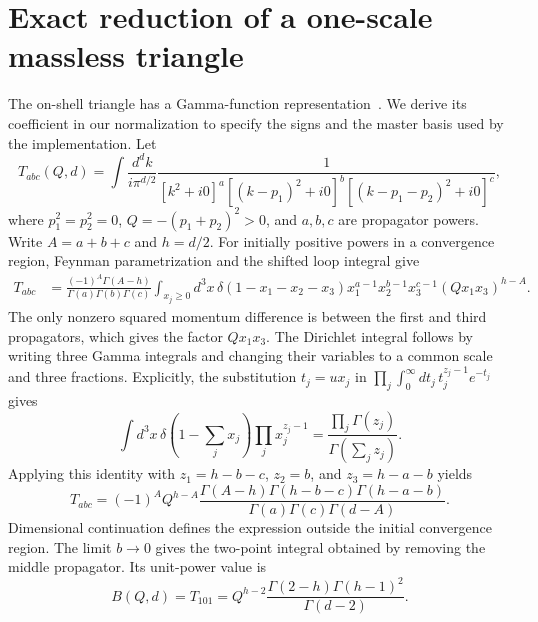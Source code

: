 \section{Exact reduction of a one-scale massless triangle}
\label{notes-triangle:app:triangle}
The on-shell triangle has a Gamma-function representation~\cite{DavydychevOsland1998}. We derive its coefficient in our normalization to specify the signs and the master basis used by the implementation. Let
\begin{equation}
 T_{abc}(Q,d)=\int\frac{d^d k}{i\pi^{d/2}}
 \frac{1}{[k^2+i0]^a[(k-p_1)^2+i0]^b[(k-p_1-p_2)^2+i0]^c},
 \label{notes-triangle:eq:triangle-definition}
\end{equation}
where $p_1^2=p_2^2=0$, $Q=-(p_1+p_2)^2>0$, and $a,b,c$ are propagator powers. Write $A=a+b+c$ and $h=d/2$. For initially positive powers in a convergence region, Feynman parametrization and the shifted loop integral give
\begin{align}
 T_{abc}&=\frac{(-1)^A\Gamma(A-h)}{\Gamma(a)\Gamma(b)\Gamma(c)}
 \int_{x_j\geq0} d^3x\,\delta(1-x_1-x_2-x_3)
 x_1^{a-1}x_2^{b-1}x_3^{c-1}(Qx_1x_3)^{h-A}.
 \label{notes-triangle:eq:triangle-parameters}
\end{align}
The only nonzero squared momentum difference is between the first and third propagators, which gives the factor $Qx_1x_3$. The Dirichlet integral follows by writing three Gamma integrals and changing their variables to a common scale and three fractions. Explicitly, the substitution $t_j=u x_j$ in $\prod_j\int_0^\infty dt_j\,t_j^{z_j-1}e^{-t_j}$ gives
\begin{equation}
 \int d^3x\,\delta(1-\textstyle\sum_j x_j)\prod_jx_j^{z_j-1}
 =\frac{\prod_j\Gamma(z_j)}{\Gamma(\sum_jz_j)}.
 \label{notes-triangle:eq:triangle-dirichlet}
\end{equation}
Applying this identity with $z_1=h-b-c$, $z_2=b$, and $z_3=h-a-b$ yields
\begin{equation}
 T_{abc}=(-1)^A Q^{h-A}
 \frac{\Gamma(A-h)\Gamma(h-b-c)\Gamma(h-a-b)}
 {\Gamma(a)\Gamma(c)\Gamma(d-A)}.
 \label{notes-triangle:eq:triangle-gamma}
\end{equation}
Dimensional continuation defines the expression outside the initial convergence region. The limit $b\to0$ gives the two-point integral obtained by removing the middle propagator. Its unit-power value is
\begin{equation}
 B(Q,d)=T_{101}=Q^{h-2}
 \frac{\Gamma(2-h)\Gamma(h-1)^2}{\Gamma(d-2)}.
 \label{notes-triangle:eq:triangle-bubble}
\end{equation}
